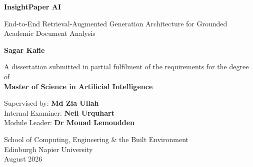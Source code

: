 \begin{titlepage}
\begin{center}
\vspace*{1cm}

\Huge
\textbf{InsightPaper AI}

\vspace{0.5cm}
\LARGE
End-to-End Retrieval-Augmented Generation Architecture for Grounded Academic Document Analysis

\vspace{1.5cm}

\textbf{Sagar Kafle}

\vspace{2cm}

A dissertation submitted in partial fulfilment of the requirements for the degree of\\
\textbf{Master of Science in Artificial Intelligence}

\vspace{2cm}

Supervised by: \textbf{Md Zia Ullah}\\
Internal Examiner: \textbf{Neil Urquhart}\\
Module Leader: \textbf{Dr Mouad Lemoudden}

\vfill

School of Computing, Engineering \& the Built Environment\\
Edinburgh Napier University\\
August 2026

\end{center}
\end{titlepage}
